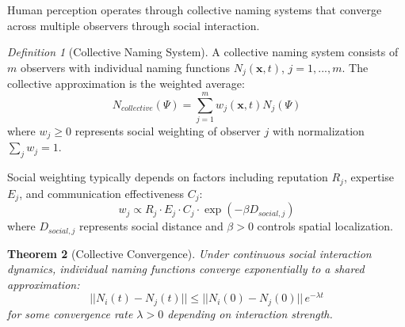 \documentclass[12pt]{article}
\newtheorem{theorem}{Theorem}[section]
\theoremstyle{definition}
\newtheorem{definition}[theorem]{Definition}
\theoremstyle{remark}
\newtheorem{definition}[theorem]{Definition}
\begin{document}
Human perception operates through collective naming systems that converge across multiple observers through social interaction.

\begin{definition}[Collective Naming System]
\label{def:collective_naming}
A collective naming system consists of $m$ observers with individual naming functions $N_j(\mathbf{x},t)$, $j = 1,...,m$. The collective approximation is the weighted average:
\begin{equation}
\label{eq:collective_naming}
N_{collective}(\Psi) = \sum_{j=1}^{m} w_j(\mathbf{x},t) N_j(\Psi)
\end{equation}
where $w_j \geq 0$ represents social weighting of observer $j$ with normalization $\sum_j w_j = 1$.
\end{definition}

Social weighting typically depends on factors including reputation $R_j$, expertise $E_j$, and communication effectiveness $C_j$:
\begin{equation}
w_j \propto R_j \cdot E_j \cdot C_j \cdot \exp(-\beta D_{social,j})
\end{equation}
where $D_{social,j}$ represents social distance and $\beta > 0$ controls spatial localization.

\begin{theorem}[Collective Convergence]
\label{thm:collective_convergence}
Under continuous social interaction dynamics, individual naming functions converge exponentially to a shared approximation:
\begin{equation}
||N_i(t) - N_j(t)|| \leq ||N_i(0) - N_j(0)|| \, e^{-\lambda t}
\end{equation}
for some convergence rate $\lambda > 0$ depending on interaction strength.
\end{theorem}
\end{document}
